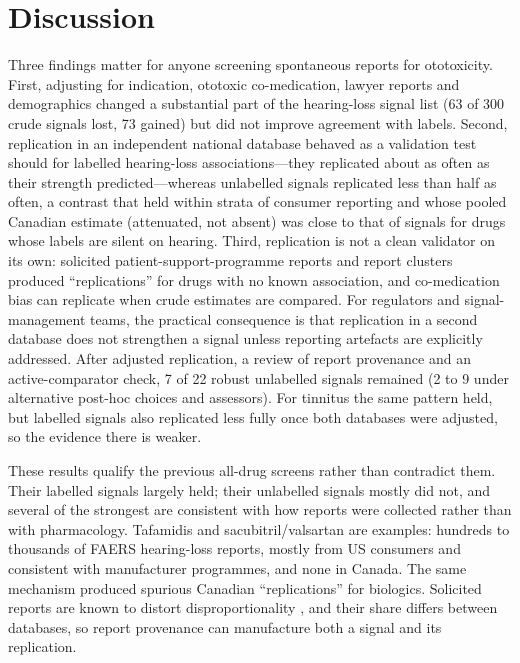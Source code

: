 
\section{Discussion}
Three findings matter for anyone screening spontaneous reports for ototoxicity. First, adjusting for indication, ototoxic
co-medication, lawyer reports and demographics changed a substantial part of the hearing-loss signal list
(63 of 300 crude signals lost, 73 gained) but did not
improve agreement with labels. Second, replication in an independent national database behaved as a validation test should
for labelled hearing-loss associations---they replicated about as often as their strength predicted---whereas unlabelled
signals replicated less than half as often, a contrast that held within strata of consumer reporting and whose pooled
Canadian estimate (attenuated, not absent) was close to that of signals for drugs whose labels are silent on hearing. Third,
replication is not a clean validator on its own: solicited patient-support-programme reports and report clusters produced
``replications'' for drugs with no known association, and co-medication bias can replicate when crude estimates are compared.
For regulators and signal-management teams, the practical consequence is that replication in a second database does not
strengthen a signal unless reporting artefacts are explicitly addressed.
After adjusted replication, a review of report provenance and an active-comparator check, 7 of 22 robust unlabelled
signals remained (2 to 9 under alternative post-hoc choices and assessors). For tinnitus the same pattern held,
but labelled signals also replicated less fully once both databases were adjusted, so the evidence there is weaker.

These results qualify the previous all-drug screens \cite{li2024,wu2025,liu2025} rather than contradict them. Their
labelled signals largely held; their unlabelled signals mostly did not, and several of the strongest are consistent with how
reports were collected rather than with pharmacology. Tafamidis and sacubitril/valsartan are examples: hundreds to thousands
of FAERS hearing-loss reports, mostly from US consumers and consistent with manufacturer programmes, and none in Canada. The same mechanism
produced spurious Canadian ``replications'' for biologics. Solicited reports are known to distort disproportionality
\cite{psp_solicited}, and their share differs between databases, so report provenance can manufacture both a signal and its
replication.

